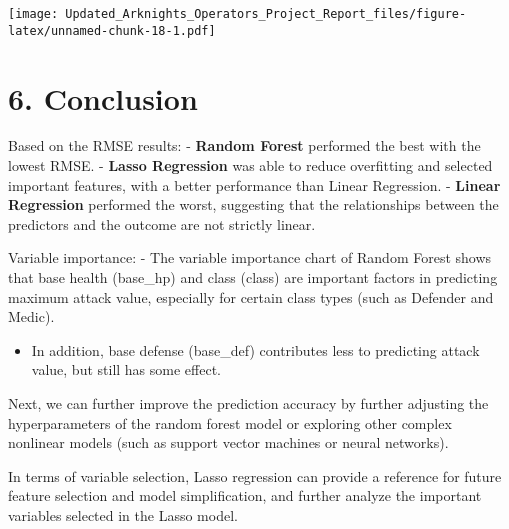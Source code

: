 \documentclass[
]{article}
\providecommand{\tightlist}{%
  \setlength{\itemsep}{0pt}\setlength{\parskip}{0pt}}
\begin{document}
\texttt{[image: Updated\_Arknights\_Operators\_Project\_Report\_files/figure-latex/unnamed-chunk-18-1.pdf]}

\section{6. Conclusion}\label{conclusion}

Based on the RMSE results: - \textbf{Random Forest} performed the best
with the lowest RMSE. - \textbf{Lasso Regression} was able to reduce
overfitting and selected important features, with a better performance
than Linear Regression. - \textbf{Linear Regression} performed the
worst, suggesting that the relationships between the predictors and the
outcome are not strictly linear.

Variable importance: - The variable importance chart of Random Forest
shows that base health (base\_hp) and class (class) are important
factors in predicting maximum attack value, especially for certain class
types (such as Defender and Medic).

\begin{itemize}
\tightlist
\item
  In addition, base defense (base\_def) contributes less to predicting
  attack value, but still has some effect.
\end{itemize}

Next, we can further improve the prediction accuracy by further
adjusting the hyperparameters of the random forest model or exploring
other complex nonlinear models (such as support vector machines or
neural networks).

In terms of variable selection, Lasso regression can provide a reference
for future feature selection and model simplification, and further
analyze the important variables selected in the Lasso model.
\end{document}
